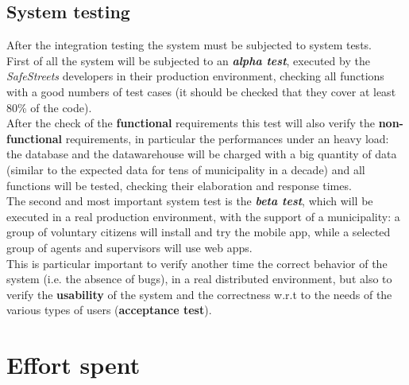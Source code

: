 \documentclass[a4paper]{report}
\begin{document}
\section{System testing}
After the integration testing the system must be subjected to system tests.\\
First of all the system will be subjected to an \textit{\textbf{alpha test}}, executed by the \textit{SafeStreets} developers in their production environment, checking all functions with a good numbers of test cases (it should be checked that they cover at least 80\% of the code).\\
After the check of the \textbf{functional} requirements this test will also verify the \textbf{non-functional} requirements, in particular the performances under an heavy load: the database and the datawarehouse will be charged with a big quantity of data (similar to the expected data for tens of municipality in a decade) and all functions will be tested, checking their elaboration and response times.\\
The second and most important system test is the \textit{\textbf{beta test}}, which will be executed in a real production environment, with the support of a municipality: a group of voluntary citizens will install and try the mobile app, while a selected group of agents and supervisors will use web apps.\\
This is particular important to verify another time the correct behavior of the system (i.e. the absence of bugs), in a real distributed environment, but also to verify the \textbf{usability} of the system and the correctness w.r.t to the needs of the various types of users (\textbf{acceptance test}).


\chapter{Effort spent}
\end{document}
